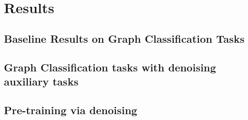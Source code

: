 \section{Results}


\subsection{Baseline Results on Graph Classification Tasks}


\subsection{Graph Classification tasks with denoising auxiliary tasks}


\subsection{Pre-training via denoising}